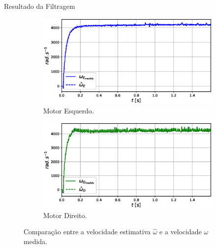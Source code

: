 \begin{frame}{Resultado da Filtragem}

    \begin{figure}
        \begin{subfigure}{.48\textwidth}
            \centering
            \includegraphics[width=1.15\textwidth]{figuras/resultados/exp02/filtro_vs_sem_filtro_esquerdo100.eps}
            \caption{Motor Esquerdo.}
        \end{subfigure}
        \begin{subfigure}{.48\textwidth}
            \centering
            \includegraphics[width=1.15\textwidth]{figuras/resultados/exp02/filtro_vs_sem_filtro_direito100.eps}
            \caption{Motor Direito.}
        \end{subfigure}
        \caption{Comparação entre a velocidade estimativa $\hat{\omega}$ e a velocidade $\omega$ medida.}
    \end{figure}
    
\end{frame}

